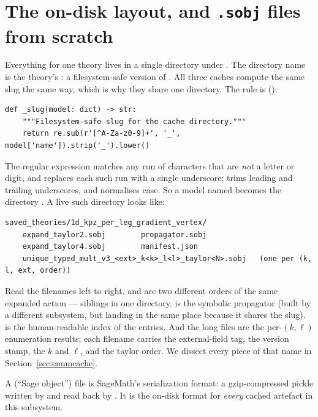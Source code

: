 \section{The on-disk layout, and \texttt{.sobj} files from scratch}

Everything for one theory lives in a single directory under
. The directory name is the theory's : a
filesystem-safe version of . All three caches compute the
same slug the same way, which is why they share one directory. The rule is
():

\begin{lstlisting}
def _slug(model: dict) -> str:
    """Filesystem-safe slug for the cache directory."""
    return re.sub(r'[^A-Za-z0-9]+', '_', model['name']).strip('_').lower()
\end{lstlisting}

The regular expression \code{[\^{}A-Za-z0-9]+} matches any run of characters
that are \emph{not} a letter or digit, and  replaces each such run
with a single underscore;  trims leading and trailing
underscores, and  normalises case. So a model named
 becomes the directory
. A live such directory looks like:

\begin{lstlisting}[style=console]
saved_theories/1d_kpz_per_leg_gradient_vertex/
    expand_taylor2.sobj        propagator.sobj
    expand_taylor4.sobj        manifest.json
    unique_typed_mult_v3_<ext>_k<k>_l<l>_taylor<N>.sobj   (one per (k, l, ext, order))
\end{lstlisting}

Read the filenames left to right.  and
 are two different orders of the same expanded
action --- siblings in one directory.  is the symbolic
propagator (built by a different subsystem, but landing in the same place
because it shares the slug).  is the human-readable index
of the  entries. And the long
 files are the per-$(k,\ell)$ enumeration
results; each filename carries the external-field tag, the version stamp, the
$k$ and $\ell$, and the taylor order. We dissect every piece of that name in
Section~\ref{sec:enumcache}.

\begin{defn}
A  (``Sage object'') file is SageMath's serialization
format: a gzip-compressed pickle written by 
and read back by . It is the on-disk format for
\emph{every} cached artefact in this subsystem.
\end{defn}

